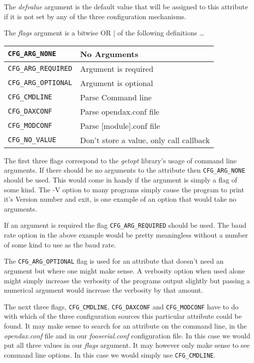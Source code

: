 The \textit{defvalue} argument is the default value that will be assigned to this attribute if it is not set by any of the three configuration mechanisms.

The \textit{flags} argument is a bitwise OR {|} of the following definitions \ldots

\begin{tabular}{|l|l|}
\hline \verb|CFG_ARG_NONE| & No Arguments \\ 
\hline \verb|CFG_ARG_REQUIRED| & Argument is required \\ 
\hline \verb|CFG_ARG_OPTIONAL| & Argument is optional \\ 
\hline \verb|CFG_CMDLINE| & Parse Command line \\ 
\hline \verb|CFG_DAXCONF| & Parse opendax.conf file \\ 
\hline \verb|CFG_MODCONF| & Parse [module].conf file \\ 
\hline \verb|CFG_NO_VALUE| & Don't store a value, only call callback \\ 
\hline 
\end{tabular} 

The first three flags correspond to the \textit{getopt} library's usage of command line arguments.  If there should be no arguments to the attribute then \verb|CFG_ARG_NONE| should be used.  This would come in handy if the argument is simply a flag of some kind.  The -V option to many programs simply cause the program to print it's Version number and exit, is one example of an option that would take no arguments.

If an argument is required the flag \verb|CFG_ARG_REQUIRED| should be used.  The baud rate option in the above example would be pretty meaningless without a number of some kind to use as the baud rate.

The \verb|CFG_ARG_OPTIONAL| flag is used for an attribute that doesn't need an argument but where one might make sense.  A verbosity option when used alone might simply increase the verbosity of the programs output slightly but passing a numerical argument would increase the verbosity by that amount.

The next three flags, \verb|CFG_CMDLINE|, \verb|CFG_DAXCONF| and \verb|CFG_MODCONF| have to do with which of the three configuration sources this particular attribute could be found.  It may make sense to search for an attribute on the command line, in the \textit{opendax.conf} file and in our \textit{fooserial.conf} configuration file.  In this case we would put all three values in our \textit{flags} argument.  It may however only make sense to see command line options.  In this case we would simply use \verb|CFG_CMDLINE|. 

